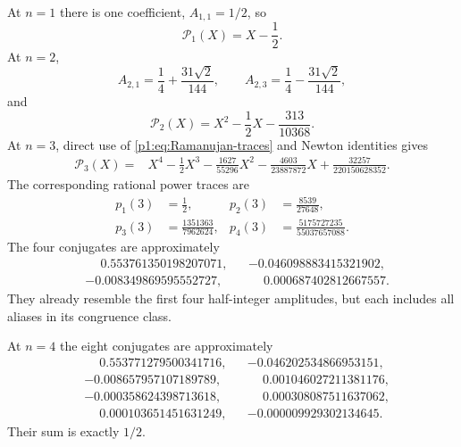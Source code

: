 \documentclass[11pt,oneside]{article}
\theoremstyle{definition}
\theoremstyle{remark}
\begin{document}
At $n=1$ there is one coefficient, $A_{1,1}=1/2$, so
\begin{equation}\label{p1:eq:P1-poly}
 \mathcal P_1(X)=X-\frac12.
\end{equation}
At $n=2$,
\begin{equation}\label{p1:eq:A2-values}
 A_{2,1}=\frac14+\frac{31\sqrt2}{144},
 \qquad
 A_{2,3}=\frac14-\frac{31\sqrt2}{144},
\end{equation}
and
\begin{equation}\label{p1:eq:P2-poly}
 \boxed{
 \mathcal P_2(X)=X^2-\frac12X-\frac{313}{10368}.}
\end{equation}
At $n=3$, direct use of \eqref{p1:eq:Ramanujan-traces} and Newton identities gives
\begin{equation}\label{p1:eq:P3-poly}
\boxed{
\begin{aligned}
 \mathcal P_3(X)={}&X^4-\frac12X^3
 -\frac{1627}{55296}X^2
 -\frac{4603}{23887872}X
 +\frac{32257}{220150628352}.
\end{aligned}}
\end{equation}
The corresponding rational power traces are
\begin{align}
 p_1(3)&=\frac12,
 &p_2(3)&=\frac{8539}{27648},
 \label{p1:eq:p3-12}\\
 p_3(3)&=\frac{1351363}{7962624},
 &p_4(3)&=\frac{5175727235}{55037657088}.
 \label{p1:eq:p3-34}
\end{align}
The four conjugates are approximately
\begin{equation}\label{p1:eq:n3-conjugates}
\begin{aligned}
 &\phantom{-}0.553761350198207071,
 &&-0.046098883415321902,\\
 &-0.008349869595552727,
 &&\phantom{-}0.000687402812667557.
\end{aligned}
\end{equation}
They already resemble the first four half-integer amplitudes, but each includes
all aliases in its congruence class.

At $n=4$ the eight conjugates are approximately
\begin{align*}
 &\phantom{-}0.553771279500341716,
 &&-0.046202534866953151,\\
 &-0.008657957107189789,
 &&\phantom{-}0.001046027211381176,\\
 &-0.000358624398713618,
 &&\phantom{-}0.000308087511637062,\\
 &\phantom{-}0.000103651451631249,
 &&-0.000009929302134645.
\end{align*}
Their sum is exactly $1/2$.
\end{document}
